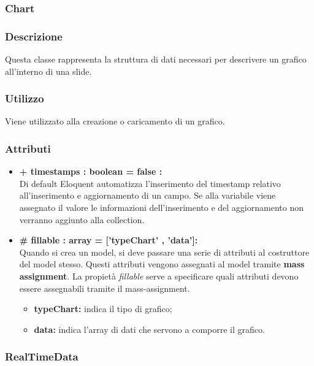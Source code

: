 \newpage
\subsubsection{Chart}


	\subsubsection*{Descrizione}
	Questa classe rappresenta la struttura di dati necessari per descrivere un grafico all’interno di una slide.
	
	\subsubsection*{Utilizzo}
Viene utilizzato alla creazione o caricamento di un grafico.

	\subsubsection*{Attributi}
	\begin{itemize}
		\item \textbf{+ timestamps : boolean = false :}\\
		Di default Eloquent automatizza l'inserimento del timestamp relativo all'inserimento e aggiornamento di un campo. Se alla variabile viene assegnato il valore le informazioni dell'inserimento e del aggiornamento non verranno aggiunto alla collection.
		\item \textbf{\# fillable : array = [’typeChart’ , ’data’]:}\\
		Quando si crea un model, si deve passare una serie di attributi al costruttore del model stesso. Questi attributi vengono assegnati al model tramite \textbf{mass assignment}. La propietà \textit{fillable} serve a specificare quali attributi devono essere assegnabili tramite il mass-assignment.
		\begin{itemize}
			\item \textbf{typeChart:} indica il tipo di grafico;
			\item \textbf{data:} indica l'array di dati che servono a comporre il grafico.
		\end{itemize}
		
	\end{itemize}
	

\newpage
\subsubsection{RealTimeData}

